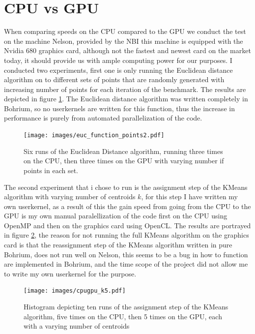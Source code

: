 \documentclass[12pt]{report}
\begin{document}
\section{CPU vs GPU}
\label{sec:cpugpu}
When comparing speeds on the CPU compared to the GPU we conduct the test on the machine Nelson, provided by the NBI this machine is equipped with the Nvidia 680 graphics card, although not the fastest and newest card on the market today, it should provide us with ample computing power for our purposes. I conducted two experiments, first one is only running the Euclidean distance algorithm on to different sets of points that are randomly generated with increasing number of points for each iteration of the benchmark. The results are depicted in figure \ref{fig:points2}. The Euclidean distance algorithm was written completely in Bohrium, so no userkernels are written for this function, thus the increase in performance is purely from automated parallelization of the code.

\begin{figure}[ht]
  \centering
  \texttt{[image: images/euc\_function\_points2.pdf]}
  \caption{\label{fig:points2}Six runs of the Euclidean Distance algorithm, running three times on the CPU, then three times on the GPU with varying number if points in each set.}
\end{figure}
The second experiment that i chose to run is the assignment step of the KMeans algorithm with varying number of centroids $k$, for this step I have written my own userkernel, as a result of this the gain speed from going from the CPU to the GPU is my own manual paralellization of the code first on the CPU using OpenMP and then on the graphics card using OpenCL. The results are portrayed in figure \ref{fig:k5}, the reason for not running the full KMeans algorithm on the graphics card is that the reassignment step of the KMeans algorithm written in pure Bohrium, does not run well on Nelson, this seems to be a bug in how to function are implemented in Bohrium, and the time scope of the project did not allow me to write my own userkernel for the purpose.

\begin{figure}[ht]
  \centering
  \texttt{[image: images/cpugpu\_k5.pdf]}
  \caption{\label{fig:k5} Histogram depicting ten runs of the assignment step of the KMeans algorithm, five times on the CPU, then 5 times on the GPU, each with a varying number of centroids}
\end{figure}
\end{document}
